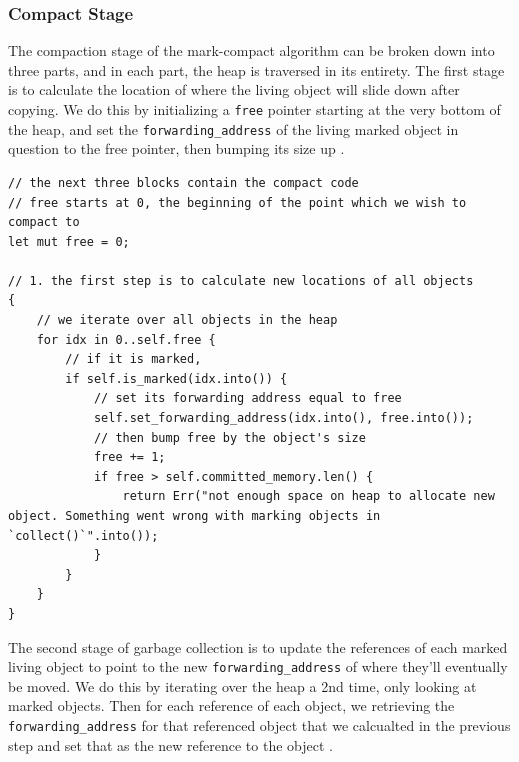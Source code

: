 \documentclass[index]{subfiles}
\begin{document}

\subsubsection{Compact Stage}

The compaction stage of the mark-compact algorithm can be broken down into three parts, and in each part, the heap is traversed in its entirety. The first stage is to calculate the location of where the living object will slide down after copying. We do this by initializing a \verb+free+ pointer starting at the very bottom of the heap, and set the \verb+forwarding_address+ of the living marked object in question to the free pointer, then bumping its size up \cites[Chapter~3]{gc_handbook}[Sections~3.3-3.5]{redhat_openjdk}.

\begin{verbatim}
// the next three blocks contain the compact code
// free starts at 0, the beginning of the point which we wish to compact to
let mut free = 0;

// 1. the first step is to calculate new locations of all objects
{
    // we iterate over all objects in the heap
    for idx in 0..self.free {
        // if it is marked,
        if self.is_marked(idx.into()) {
            // set its forwarding address equal to free
            self.set_forwarding_address(idx.into(), free.into());
            // then bump free by the object's size
            free += 1;
            if free > self.committed_memory.len() {
                return Err("not enough space on heap to allocate new object. Something went wrong with marking objects in `collect()`".into());
            }
        }
    }
}
\end{verbatim}

The second stage of garbage collection is to update the references of each marked living object to point to the new \verb+forwarding_address+ of where they'll eventually be moved. We do this by iterating over the heap a 2nd time, only looking at marked objects. Then for each reference of each object, we retrieving the \verb+forwarding_address+ for that referenced object that we calcualted in the previous step and set that as the new reference to the object \cites[Chapter 3]{gc_handbook}[Sec.~3.4]{redhat_openjdk}.
\end{document}
